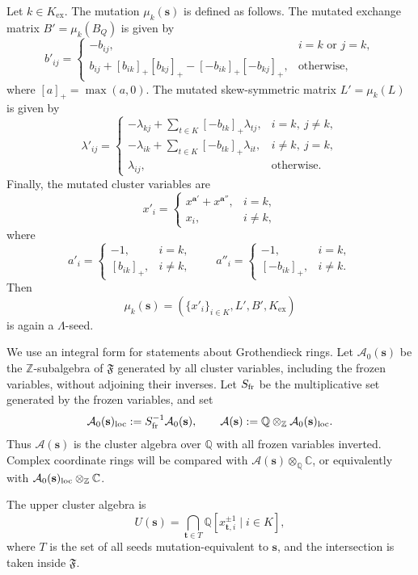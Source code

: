 \documentclass[12pt, reqno]{amsart}
\theoremstyle{plain}
\theoremstyle{definition}
\numberwithin{equation}{section}
\newcommand{\cA}{\mathcal{A}}
\begin{document}
Let \(k\in K_{\operatorname{ex}}\). The mutation \(\mu_k(\mathbf s)\) is defined as follows.
The mutated exchange matrix \(B'=\mu_k(B_Q)\) is given by
\[
b'_{ij}
=
\begin{cases}
-b_{ij}, & i=k \text{ or } j=k,\\
b_{ij}+[b_{ik}]_+[b_{kj}]_+
-[-b_{ik}]_+[-b_{kj}]_+,
& \text{otherwise},
\end{cases}
\]
where \([a]_+=\max(a,0)\). The mutated skew-symmetric matrix
\(L'=\mu_k(L)\) is given by
\[
\lambda'_{ij}
=
\begin{cases}
-\lambda_{kj}+\displaystyle\sum_{t\in K}[-b_{tk}]_+\lambda_{tj},
& i=k,\ j\ne k,\\[6pt]
-\lambda_{ik}+\displaystyle\sum_{t\in K}[-b_{tk}]_+\lambda_{it},
& i\ne k,\ j=k,\\[6pt]
\lambda_{ij}, & \text{otherwise}.
\end{cases}
\]
Finally, the mutated cluster variables are
\[
x'_i=
\begin{cases}
x^{\mathbf a'}+x^{\mathbf a''}, & i=k,\\
x_i, & i\ne k,
\end{cases}
\]
where
\[
a'_i=
\begin{cases}
-1, & i=k,\\
[b_{ik}]_+, & i\ne k,
\end{cases}
\qquad
a''_i=
\begin{cases}
-1, & i=k,\\
[-b_{ik}]_+, & i\ne k.
\end{cases}
\]
Then
\[
\mu_k(\mathbf s)
=
(\{x'_i\}_{i\in K},L',B',K_{\operatorname{ex}})
\]
is again a \(\Lambda\)-seed.

We use an integral form for statements about Grothendieck rings.
Let \(\cA_0(\mathbf s)\) be the \(\mathbb Z\)-subalgebra of
\(\mathfrak F\) generated by all cluster variables, including the
frozen variables, without adjoining their inverses. Let \(S_{\rm fr}\)
be the multiplicative set generated by the frozen variables, and set
\[
\cA_0(\mathbf s)_{\rm loc}:=S_{\rm fr}^{-1}\cA_0(\mathbf s),
\qquad
\cA(\mathbf s):=\mathbb Q\otimes_{\mathbb Z}
\cA_0(\mathbf s)_{\rm loc}.
\]
Thus \(\cA(\mathbf s)\) is the cluster algebra over \(\mathbb Q\)
with all frozen variables inverted. Complex coordinate rings will be
compared with \(\cA(\mathbf s)\otimes_{\mathbb Q}\mathbb C\), or
equivalently with
\(\cA_0(\mathbf s)_{\rm loc}\otimes_{\mathbb Z}\mathbb C\).

The upper cluster algebra is
\[
U(\mathbf s)
=
\bigcap_{\mathbf t\in T}
\mathbb Q[x_{\mathbf t,i}^{\pm1}\mid i\in K],
\]
where \(T\) is the set of all seeds mutation-equivalent to \(\mathbf s\), and
the intersection is taken inside \(\mathfrak F\).
\end{document}
